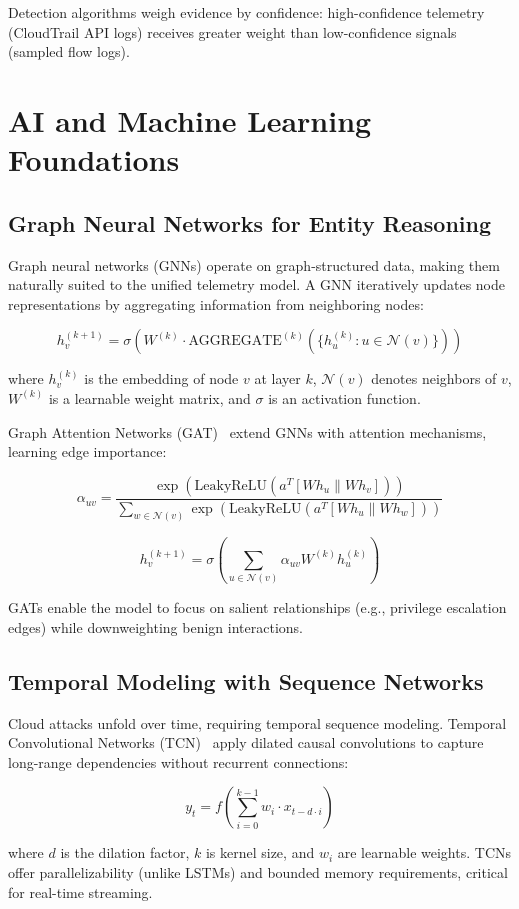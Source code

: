 Detection algorithms weigh evidence by confidence: high-confidence telemetry (CloudTrail API logs) receives greater weight than low-confidence signals (sampled flow logs).

\section{AI and Machine Learning Foundations}\label{sec:theory-ai}
\subsection{Graph Neural Networks for Entity Reasoning}
Graph neural networks (GNNs) operate on graph-structured data, making them naturally suited to the unified telemetry model. A GNN iteratively updates node representations by aggregating information from neighboring nodes:

$$h_v^{(k+1)} = \sigma\left( W^{(k)} \cdot \text{AGGREGATE}^{(k)}\left(\{h_u^{(k)} : u \in \mathcal{N}(v)\}\right) \right)$$

where $h_v^{(k)}$ is the embedding of node $v$ at layer $k$, $\mathcal{N}(v)$ denotes neighbors of $v$, $W^{(k)}$ is a learnable weight matrix, and $\sigma$ is an activation function.

Graph Attention Networks (GAT)~\cite{velickovic2017gat} extend GNNs with attention mechanisms, learning edge importance:

$$\alpha_{uv} = \frac{\exp(\text{LeakyReLU}(a^T [W h_u \| W h_v]))}{\sum_{w \in \mathcal{N}(v)} \exp(\text{LeakyReLU}(a^T [W h_u \| W h_w]))}$$

$$h_v^{(k+1)} = \sigma\left(\sum_{u \in \mathcal{N}(v)} \alpha_{uv} W^{(k)} h_u^{(k)}\right)$$

GATs enable the model to focus on salient relationships (e.g., privilege escalation edges) while downweighting benign interactions.

\subsection{Temporal Modeling with Sequence Networks}
Cloud attacks unfold over time, requiring temporal sequence modeling. Temporal Convolutional Networks (TCN)~\cite{bai2018tconvnet} apply dilated causal convolutions to capture long-range dependencies without recurrent connections:

$$y_t = f\left(\sum_{i=0}^{k-1} w_i \cdot x_{t - d \cdot i}\right)$$

where $d$ is the dilation factor, $k$ is kernel size, and $w_i$ are learnable weights. TCNs offer parallelizability (unlike LSTMs) and bounded memory requirements, critical for real-time streaming.

